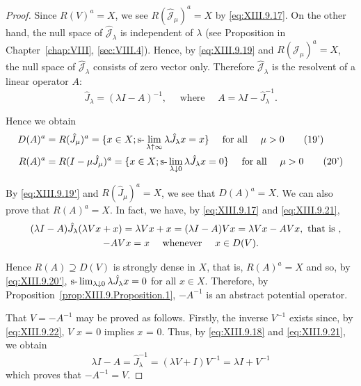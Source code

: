 \begin{proof}
Since $R(V)^{a} = X$, we see $R(\hat{\mathcal{J}}_{\mu})^{a} = X$ by \eqref{eq:XIII.9.17}. On the other hand, the null space of $\hat{\mathcal{J}}_{\lambda}$ is independent of $\lambda$ (see Proposition in Chapter~\ref{chap:VIII}, \ref{sec:VIII.4}). Hence, by \eqref{eq:XIII.9.19} and $R(\hat{\mathcal{J}}_{\mu})^{a} = X$, the null space of $\hat{\mathcal{J}}_{\lambda}$ consists of zero vector only. Therefore $\hat{\mathcal{J}}_{\lambda}$ is the resolvent of a linear operator $A$: 
\begin{equation}\label{eq:XIII.9.21}
\hat {J} _{\lambda} = (\lambda I - A) ^{-1}, \quad \text{ where } \quad A = \lambda I - \hat {J} _{\lambda} ^{-1}.
\end{equation}

Hence we obtain 
\begin{align}
D (A) ^{a}& = R (\hat {J} _{\mu}) ^{a} = \{x \in X; \text{s-}\lim _{\lambda \uparrow \infty} \lambda \hat {J} _{\lambda} x = x \} \quad \text{ for all } \quad \mu > 0 \tag{19'}\label{eq:XIII.9.19'} \\
R (A) ^{a}& = R (I - \mu \hat {J} _{\mu}) ^{a} = \{x \in X; \text{s-}\lim _{\lambda \downarrow 0} \lambda \hat {J} _{\lambda} x = 0 \} \quad \text{ for all } \quad \mu > 0 \tag{20'}\label{eq:XIII.9.20'}
\end{align}

By \eqref{eq:XIII.9.19'} and $R(\hat{J}_{\mu})^a = X$, we see that $D(A)^a = X$. We can also prove that $R(A)^a = X$. In fact, we have, by \eqref{eq:XIII.9.17} and \eqref{eq:XIII.9.21}, 
\begin{gather}\quad (\lambda I - A) \hat {J} _{\lambda} (\lambda V x + x)= \lambda V x + x = (\lambda I - A) V x = \lambda V x - A V x, \text{ that is }, \notag
\\- A V x = x \quad \text{ whenever } \quad x \in D (V) . \label{eq:XIII.9.22}
\end{gather}

Hence $R(A) \supseteq D(V)$ is strongly dense in $X$, that is, $R(A)^{a} = X$ and so, by \eqref{eq:XIII.9.20'}, $\text{s-}\lim\nolimits_{\lambda \downarrow 0} \lambda \hat{J}_{\lambda} x = 0$ for all $x \in X$. Therefore, by Proposition~\ref{prop:XIII.9.Proposition.1}, $-A^{-1}$ is an abstract potential operator. 


That $V = -A^{-1}$ may be proved as follows. Firstly, the inverse $V^{-1}$ exists since, by \eqref{eq:XIII.9.22}, $V$ $x$ = $0$ implies $x$ = $0$. Thus, by \eqref{eq:XIII.9.18} and \eqref{eq:XIII.9.21}, we obtain 
\[
\lambda I - A = \hat {J} _{\lambda} ^{-1} = (\lambda V + I) V ^{-1} = \lambda I + V ^{-1}
\]
which proves that $-A^{-1}=V$.
\end{proof}

